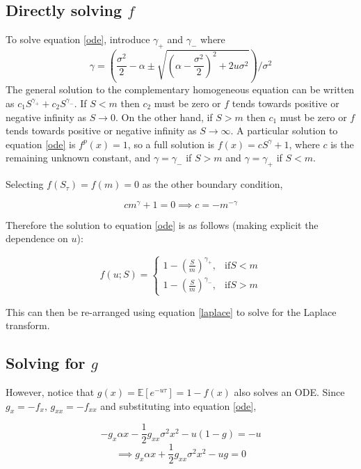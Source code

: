 \documentclass[12pt]{article}
\begin{document}
\subsection{Directly solving \(f\)}

To solve equation \ref{ode}, introduce \(\gamma_+\) and \(\gamma_{-}\) where \[\gamma =  \left(\frac{\sigma^2}{2}-\alpha  \pm \sqrt{\left(\alpha -\frac{\sigma^2}{2}\right)^2+2u\sigma^2}\right)/\sigma^2\]
The general solution to the complementary homogeneous equation can be written as \(c_1 S ^ {\gamma_+}+c_2 S^{\gamma_{-}}\).   If \(S<m\) then \(c_2\) must be zero or \(f\) tends towards positive or negative infinity as \(S \to 0\).  On the other hand, if \(S>m\) then \(c_1\) must be zero or \(f\) tends towards positive or negative infinity as \(S \to \infty\). A particular solution to equation \ref{ode} is \(f^p(x)=1\), so a full solution is \(f(x)=c S ^ \gamma +1\), where \(c\) is the remaining unknown constant, and \(\gamma = \gamma_{-}\) if \(S>m\) and \(\gamma= \gamma_{+}\) if \(S<m\).

Selecting \(f(S_\tau)=f(m)=0\) as the other boundary condition,

\[c m^{\gamma}+1=0 \implies c = -m^{-\gamma}\]

Therefore the solution to equation \ref{ode} is as follows (making explicit the dependence on \(u\)):

\begin{equation}
f(u; S)=\left\{
\begin{array}{rl}
1-\left(\frac{S}{m} \right) ^ {\gamma_{+}} , & \mathrm{if}  S<m \\
1-\left(\frac{S}{m} \right) ^ {\gamma_{-}}, & \mathrm{if} S>m
\end{array}
\right.
\end{equation}

This can then be re-arranged using equation \ref{laplace} to solve for the Laplace transform.

\subsection{Solving for \(g\)}\label{homogenous}

However, notice that \(g(x)=\mathbb{E}\left[e^{-u\tau}\right]=1-f(x)\) also solves an ODE.  Since \(g_x=-f_x,\,g_{xx}=-f_{xx}\) and substituting into equation \ref{ode}, 

\[-g_x\alpha x -\frac{1}{2} g_{xx} \sigma^2 x^2-u(1-g)=-u\]
\[\implies g_x \alpha x + \frac{1}{2} g_{xx} \sigma^2 x^2-ug=0\]
\end{document}
